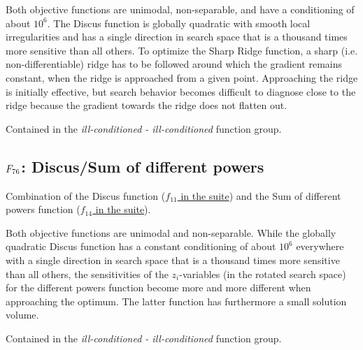 Both objective functions are unimodal, non-separable, and have a conditioning
of about \(10^6\).
The Discus function is globally quadratic with smooth local irregularities
and has a single direction in search space that is a thousand times more
sensitive than all others.
To optimize the Sharp Ridge function, a sharp (i.e. non-differentiable) ridge
has to be followed around which the gradient remains constant, when the
ridge is approached from a given point. Approaching the ridge is
initially effective, but search behavior becomes difficult to diagnose
close to the ridge because the gradient towards the ridge does not flatten out.

Contained in the \emph{ill-conditioned - ill-conditioned} function group.



\subsection[\texorpdfstring{\protect\(F_{76}\protect\): Discus/Sum of different powers}{F76: Discus/Sum of different powers}]{\texorpdfstring{\protect\(F_{76}\protect\): Discus/Sum of different powers}{}}
\label{index:f76}\label{index:discus-sum-of-different-powers}
Combination of the Discus function (\href{https://coco.gforge.inria.fr/downloads/download16.00/bbobdocfunctions.pdf\#page=55}{\(f_{11}\) in the \bbob suite}) and the
Sum of different powers function (\href{https://coco.gforge.inria.fr/downloads/download16.00/bbobdocfunctions.pdf\#page=70}{\(f_{14}\) in the \bbob suite}).

Both objective functions are unimodal and non-separable. While the
globally quadratic Discus function has a constant conditioning
of about \(10^6\) everywhere
with a single direction in search space that is a thousand times more
sensitive than all others, the sensitivities of the
\(z_i\)-variables (in the rotated search space)
for the different powers function become more and more different when
approaching the optimum. The latter function has furthermore a small
solution volume.

Contained in the \emph{ill-conditioned - ill-conditioned} function group.



